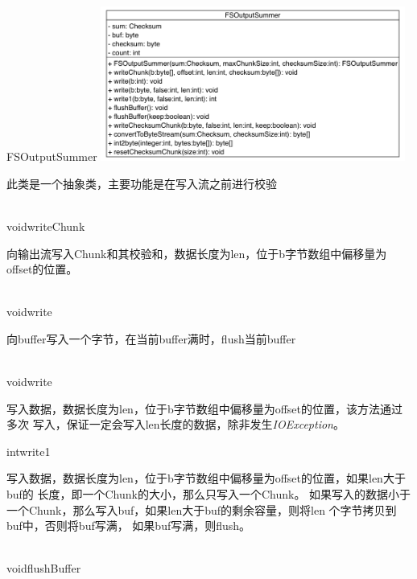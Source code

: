 \begin{XeClass}{FSOutputSummer}
\includegraphics[width=10cm]{cdig/FSOutputSummer.png}
     
 此类是一个抽象类，主要功能是在写入流之前进行校验

    \begin{XeMethod}{\XeProtected \\ \XeAbstract}{void}{writeChunk}
         
 向输出流写入Chunk和其校验和，数据长度为len，位于b字节数组中偏移量为offset的位置。

    \end{XeMethod}

    \begin{XeMethod}{\XePublic \\ \XeSync}{void}{write}
         
 向buffer写入一个字节，在当前buffer满时，flush当前buffer

    \end{XeMethod}

    \begin{XeMethod}{\XePublic \\ \XeSync}{void}{write}
         
 写入数据，数据长度为len，位于b字节数组中偏移量为offset的位置，该方法通过多次
 写入，保证一定会写入len长度的数据，除非发生\emph{IOException}。

    \end{XeMethod}

    \begin{XeMethod}{\XePrivate}{int}{write1}
         
 写入数据，数据长度为len，位于b字节数组中偏移量为offset的位置，如果len大于buf的
 长度，即一个Chunk的大小，那么只写入一个Chunk。
 如果写入的数据小于一个Chunk，那么写入buf，如果len大于buf的剩余容量，则将len
 个字节拷贝到buf中，否则将buf写满，
 如果buf写满，则flush。

    \end{XeMethod}

    \begin{XeMethod}{\XeProtected \\ \XeSync}{void}{flushBuffer}
         

\end{XeMethod}
\end{XeClass}
